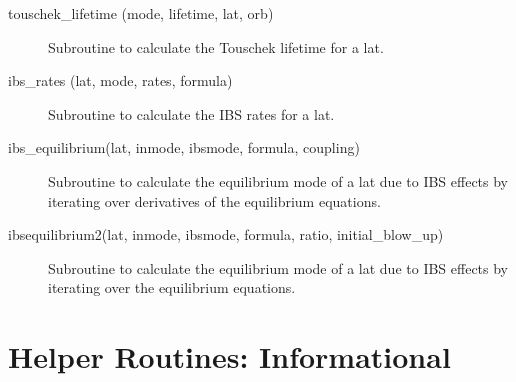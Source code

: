 \begin{description}

\item[touschek_lifetime (mode, lifetime, lat, orb)] \Newline
Subroutine to calculate the Touschek lifetime for a lat.

\item[ibs_rates (lat, mode, rates, formula)] \Newline
Subroutine to calculate the IBS rates for a lat.

\item[ibs_equilibrium(lat, inmode, ibsmode, formula, coupling)] \Newline
Subroutine to calculate the equilibrium mode of a lat due to IBS effects
by iterating over derivatives of the equilibrium equations.

\item[ibsequilibrium2(lat, inmode, ibsmode, formula, ratio, initial_blow_up)] \Newline
Subroutine to calculate the equilibrium mode of a lat due to IBS effects
by iterating over the equilibrium equations.

\end{description}

\section{Helper Routines: Informational}
\label{r:info}     

